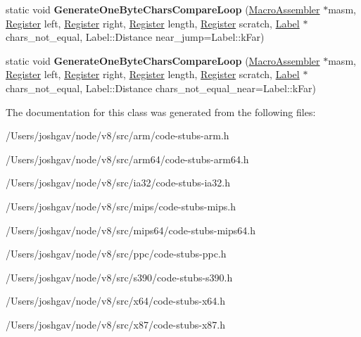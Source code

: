 \begin{DoxyCompactItemize}
\item 
static void {\bfseries Generate\+One\+Byte\+Chars\+Compare\+Loop} (\hyperlink{classv8_1_1internal_1_1_macro_assembler}{Macro\+Assembler} $\ast$masm, \hyperlink{structv8_1_1internal_1_1_register}{Register} left, \hyperlink{structv8_1_1internal_1_1_register}{Register} right, \hyperlink{structv8_1_1internal_1_1_register}{Register} length, \hyperlink{structv8_1_1internal_1_1_register}{Register} scratch, \hyperlink{classv8_1_1internal_1_1_label}{Label} $\ast$chars\+\_\+not\+\_\+equal, Label\+::\+Distance near\+\_\+jump=Label\+::k\+Far)\hypertarget{classv8_1_1internal_1_1_string_helper_acba434fcf0f4cc61749f6197e14a8b29}{}\label{classv8_1_1internal_1_1_string_helper_acba434fcf0f4cc61749f6197e14a8b29}

\item 
static void {\bfseries Generate\+One\+Byte\+Chars\+Compare\+Loop} (\hyperlink{classv8_1_1internal_1_1_macro_assembler}{Macro\+Assembler} $\ast$masm, \hyperlink{structv8_1_1internal_1_1_register}{Register} left, \hyperlink{structv8_1_1internal_1_1_register}{Register} right, \hyperlink{structv8_1_1internal_1_1_register}{Register} length, \hyperlink{structv8_1_1internal_1_1_register}{Register} scratch, \hyperlink{classv8_1_1internal_1_1_label}{Label} $\ast$chars\+\_\+not\+\_\+equal, Label\+::\+Distance chars\+\_\+not\+\_\+equal\+\_\+near=Label\+::k\+Far)\hypertarget{classv8_1_1internal_1_1_string_helper_ab8aaed6a4ad5582bc330b0f8662e7def}{}\label{classv8_1_1internal_1_1_string_helper_ab8aaed6a4ad5582bc330b0f8662e7def}

\end{DoxyCompactItemize}


The documentation for this class was generated from the following files\+:\begin{DoxyCompactItemize}
\item 
/\+Users/joshgav/node/v8/src/arm/code-\/stubs-\/arm.\+h\item 
/\+Users/joshgav/node/v8/src/arm64/code-\/stubs-\/arm64.\+h\item 
/\+Users/joshgav/node/v8/src/ia32/code-\/stubs-\/ia32.\+h\item 
/\+Users/joshgav/node/v8/src/mips/code-\/stubs-\/mips.\+h\item 
/\+Users/joshgav/node/v8/src/mips64/code-\/stubs-\/mips64.\+h\item 
/\+Users/joshgav/node/v8/src/ppc/code-\/stubs-\/ppc.\+h\item 
/\+Users/joshgav/node/v8/src/s390/code-\/stubs-\/s390.\+h\item 
/\+Users/joshgav/node/v8/src/x64/code-\/stubs-\/x64.\+h\item 
/\+Users/joshgav/node/v8/src/x87/code-\/stubs-\/x87.\+h\end{DoxyCompactItemize}

